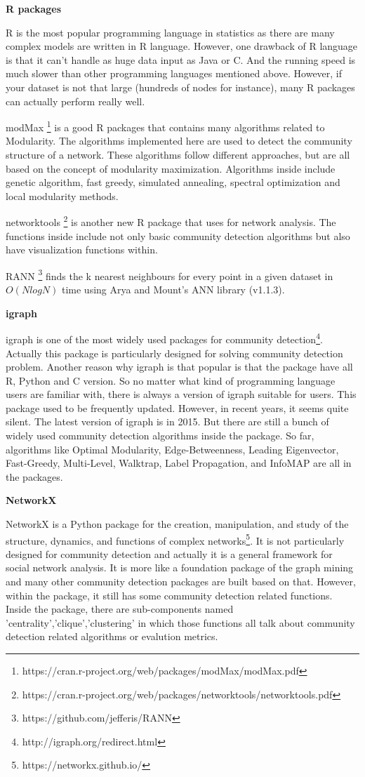 \textbf{R packages}

R is the most popular programming language in statistics as there are many complex models are written in R language. However, one drawback of R language is that it can't handle as huge data input as Java or C. And the running speed is much slower than other programming languages mentioned above. However, if your dataset is not that large (hundreds of nodes for instance), many R packages can actually perform really well.

modMax \footnote{https://cran.r-project.org/web/packages/modMax/modMax.pdf} is a good R packages that contains many algorithms related to Modularity. The algorithms implemented here are used to detect the community structure of a network. These algorithms follow different approaches, but are all based on the concept of modularity
maximization. Algorithms inside include  genetic algorithm, fast greedy, simulated annealing,  spectral optimization and  local modularity methods.

networktools \footnote{https://cran.r-project.org/web/packages/networktools/networktools.pdf} is another new R package that uses for network analysis. The functions inside include not only basic community detection algorithms but also have visualization functions within. 

RANN \footnote{ https://github.com/jefferis/RANN} finds the k nearest neighbours for every point in a given dataset in $O(NlogN)$ time using Arya and Mount's ANN library (v1.1.3).  

\textbf{igraph}

igraph \cite{csardi2006igraph} is one of the most widely used packages for community detection\footnote{http://igraph.org/redirect.html}. Actually this package is particularly designed for solving community detection problem. Another reason why igraph is that popular is that the package have all R, Python and C version. So no matter what kind of programming language users are familiar with, there is always a version of igraph suitable for users. This package used to be frequently updated. However, in recent years, it seems quite silent. The latest version of igraph is in 2015. But there are still a bunch of widely used community detection algorithms inside the package. So far, algorithms like Optimal Modularity, Edge-Betweenness, Leading Eigenvector, Fast-Greedy, Multi-Level, Walktrap, Label Propagation, and InfoMAP are all in the packages.


\textbf{NetworkX}

NetworkX \cite{hagberg2013networkx} is a Python package for the creation, manipulation, and study of the structure, dynamics, and functions of complex networks\footnote{https://networkx.github.io/}. It is not particularly designed for community detection and actually it is a general framework for social network analysis. It is more like a foundation package of the graph mining and many other community detection packages are built based on that. However, within the package, it still has some community detection related functions. Inside the package, there are sub-components named 'centrality','clique','clustering' in which those functions all talk about community detection related algorithms or evalution metrics.


